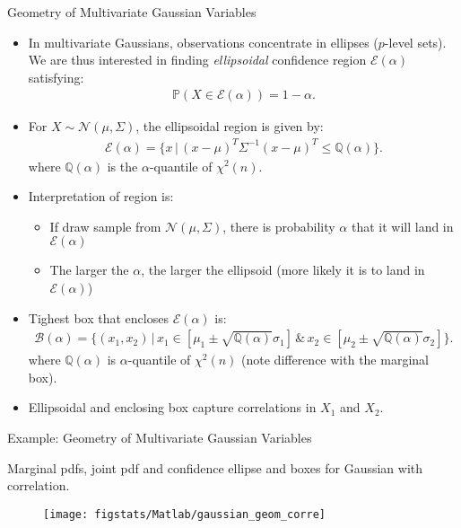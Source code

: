 \documentclass[9pt]{beamer}
\begin{document}
%
\begin{frame}{Geometry of Multivariate Gaussian Variables}

\begin{itemize}
\item  In multivariate Gaussians, observations concentrate in ellipses ($p$-level sets). We are thus interested in finding {\em ellipsoidal} confidence region $\mathcal{E}(\alpha)$ satisfying:
\begin{align*}
\mathbb{P}(X\in \mathcal{E}(\alpha))=1-\alpha.
\end{align*}
\item For $X\sim \mathcal{N}(\mu,\Sigma)$, the ellipsoidal region is given by:
\begin{align*}
\mathcal{E}(\alpha)=\{x\,|\,(x-\mu)^T\Sigma^{-1}(x-\mu)^T\leq \mathbb{Q}(\alpha)\}.
\end{align*}
where $\mathbb{Q}(\alpha)$ is the $\alpha$-quantile of $\chi^2(n)$.  
\item  Interpretation of region is:
\begin{itemize}
\item If draw sample from $\mathcal{N}(\mu,\Sigma)$, there is probability $\alpha$ that it will land in $\mathcal{E}(\alpha)$
\item The larger the $\alpha$, the larger the ellipsoid (more likely it is to land in $\mathcal{E}(\alpha)$)
\end{itemize}
\item Tighest box that encloses $\mathcal{E}(\alpha)$ is:
\begin{align*}
\mathcal{B}(\alpha)=\{(x_1,x_2)\,|\,x_1\in [\mu_1\pm \sqrt{\mathbb{Q}(\alpha)}\sigma_1]\,\&\,x_2\in [\mu_2\pm \sqrt{\mathbb{Q}(\alpha)}\sigma_2]\}.
\end{align*}
where $\mathbb{Q}(\alpha)$ is  $\alpha$-quantile of $\chi^2(n)$ (note difference with the marginal box). 
\item Ellipsoidal and enclosing box capture correlations in $X_1$ and $X_2$.
\end{itemize}

\end{frame}

%
\begin{frame}{Example: Geometry of Multivariate Gaussian Variables}

Marginal pdfs, joint pdf and confidence ellipse and boxes for Gaussian with correlation. 
\begin{figure}[!htb]
    \centering
	\texttt{[image: figstats/Matlab/gaussian\_geom\_corre]}
\end{figure}

\end{frame}
\end{document}

